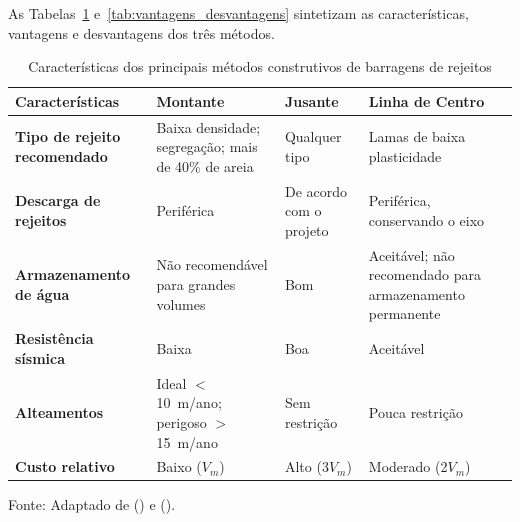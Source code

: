 As Tabelas~\ref{tab:caracteristicas_barragens} e~\ref{tab:vantagens_desvantagens} sintetizam as características, vantagens e desvantagens dos três métodos.

\begin{table}[h!]
    \centering
    \caption{Características dos principais métodos construtivos de barragens de rejeitos}
    \label{tab:caracteristicas_barragens}
    \begin{tabular}{|p{3.8cm}|p{3.3cm}|p{3.3cm}|p{3.3cm}|}
        \hline
        \textbf{Características} & \textbf{Montante} & \textbf{Jusante} & \textbf{Linha de Centro} \\
        \hline
        \textbf{Tipo de rejeito recomendado} &
        Baixa densidade; segregação; mais de 40\% de areia &
        Qualquer tipo &
        Lamas de baixa plasticidade \\
        \hline
        \textbf{Descarga de rejeitos} &
        Periférica &
        De acordo com o projeto &
        Periférica, conservando o eixo \\
        \hline
        \textbf{Armazenamento de água} &
        Não recomendável para grandes volumes &
        Bom &
        Aceitável; não recomendado para armazenamento permanente \\
        \hline
        \textbf{Resistência sísmica} &
        Baixa &
        Boa &
        Aceitável \\
        \hline
        \textbf{Alteamentos} &
        Ideal $<$10~m/ano; perigoso $>$15~m/ano &
        Sem restrição &
        Pouca restrição \\
        \hline
        \textbf{Custo relativo} &
        Baixo ($V_m$) &
        Alto (3$V_m$) &
        Moderado (2$V_m$) \\
        \hline
    \end{tabular}
    \footnotesize
    Fonte: Adaptado de \citeauthor{freire2020} (\citeyear{freire2020}) e \citeauthor{lozano2006} (\citeyear{lozano2006}).
\end{table}

